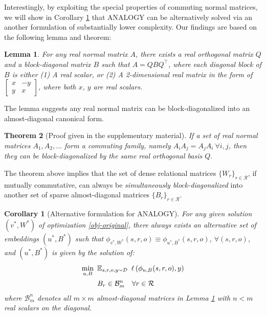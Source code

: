 \documentclass{article}
\newtheorem{theorem}{Theorem}[section]
\newtheorem{corollary}{Corollary}[theorem]
\newtheorem{lemma}[theorem]{Lemma}
\begin{document}
Interestingly,
by exploiting the special properties of commuting normal matrices,
we will show in Corollary \ref{coro:alternative} that ANALOGY can be alternatively solved
via an another formulation of substantially lower complexity.
Our findings are based on the following lemma and theorem:

\begin{lemma} \cite{wilkinson1965algebraic}
    For any real normal matrix $A$,
    there exists a real orthogonal matrix $Q$ and a block-diagonal matrix $B$ such that $A = QBQ^\top$, where each diagonal block of $B$ is either (1) A real scalar, or (2) A 2-dimensional real matrix in the form of
            $
            \begin{bmatrix}
                x & -y \\
                y & x 
            \end{bmatrix}
            $, where both $x$, $y$ are real scalars.


    \label{lem:diagonal}
\end{lemma}
The lemma suggests any real normal matrix can be block-diagonalized
into an almost-diagonal canonical form.

\begin{theorem}
[Proof given in the supplementary material]
    If a set of real normal matrices $A_1, A_2, ... $ form a commuting family,
    namely
    $
    A_i A_j = A_j A_i\ \forall i, j$,
    then they can be block-diagonalized by the same real orthogonal basis $Q$.
\label{thm:commutativity}
\end{theorem}
The theorem above implies that the set of dense relational matrices $\{W_r\}_{r \in \mathcal{R}}$,
if mutually commutative,
can always be \emph{simultaneously block-diagonalized}
into another set of sparse almost-diagonal matrices $\{B_r\}_{r \in \mathcal{R}}$.
\begin{corollary}[Alternative formulation for ANALOGY]
    For any given solution $(v^*, W^*)$ of optimization \eqref{obj-original},
    there always exists an alternative set of embeddings $(u^*, B^*)$
    such that $\phi_{v^*, W^*}(s, r, o) \equiv \phi_{u^*, B^*}(s, r, o)$,
    $\forall (s, r, o)$,
    and $(u^*, B^*)$ is given by the solution of:
    \begin{align}
        \min_{u, B} &\enskip \mathbb{E}_{s,r,o,y \sim \mathcal{D}}\enskip \ell\left(\phi_{u, B}(s, r, o), y\right) \label{obj-alternative} \\
        &\enskip B_r \in \mathcal{B}^n_m \quad \forall r \in \mathcal{R} \label{eq:constraint-B}
    \end{align}
    where $\mathcal{B}^n_m$ denotes all $m \times m$ almost-diagonal matrices 
    in Lemma \ref{lem:diagonal} with $n < m$ real scalars on the diagonal.
    \label{coro:alternative}
\end{corollary}
\end{document}
